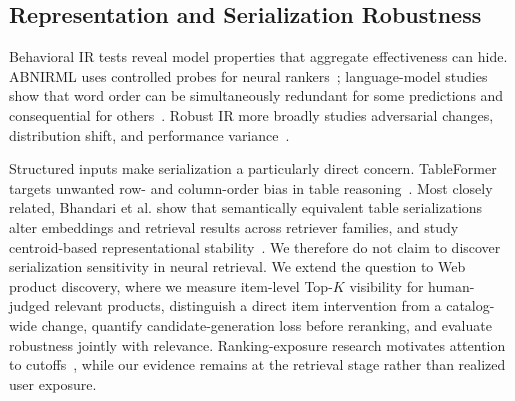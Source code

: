 \subsection{Representation and Serialization Robustness}

Behavioral IR tests reveal model properties that aggregate effectiveness can hide. ABNIRML uses controlled probes for neural rankers~\cite{macavaney2022abnirml}; language-model studies show that word order can be simultaneously redundant for some predictions and consequential for others~\cite{hessel2021order,abdou2022wordorder,papadimitriou2022role}. Robust IR more broadly studies adversarial changes, distribution shift, and performance variance~\cite{liu2024robustnir}.

Structured inputs make serialization a particularly direct concern. TableFormer targets unwanted row- and column-order bias in table reasoning~\cite{yang2022tableformer}. Most closely related, Bhandari et al. show that semantically equivalent table serializations alter embeddings and retrieval results across retriever families, and study centroid-based representational stability~\cite{bhandari2026tabular}. We therefore do not claim to discover serialization sensitivity in neural retrieval. We extend the question to Web product discovery, where we measure item-level Top-$K$ visibility for human-judged relevant products, distinguish a direct item intervention from a catalog-wide change, quantify candidate-generation loss before reranking, and evaluate robustness jointly with relevance. Ranking-exposure research motivates attention to cutoffs~\cite{joachims2017unbiased,singh2018fairness}, while our evidence remains at the retrieval stage rather than realized user exposure.

